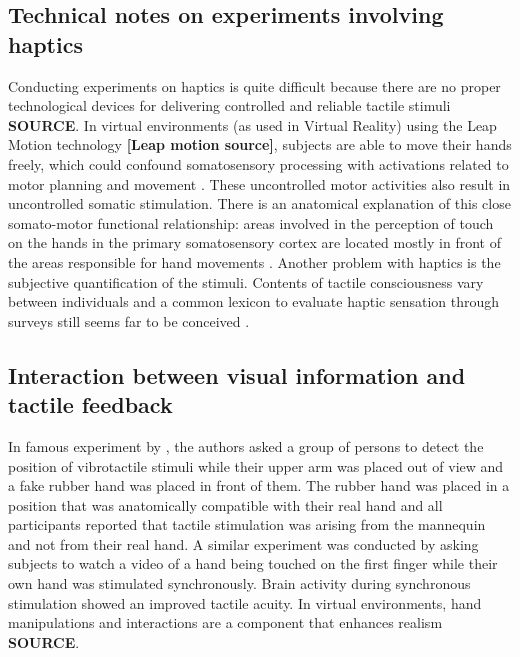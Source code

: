 \documentclass{vgtc}
\begin{document}
\subsection{Technical notes on experiments involving haptics}
Conducting experiments on haptics is quite difficult because there are no proper technological devices for delivering controlled and reliable tactile stimuli \textbf{SOURCE}. In virtual environments (as used in Virtual Reality) using the Leap Motion technology \textbf{[Leap motion source]}, subjects are able to move their hands freely, which  could confound somatosensory processing with activations related to motor planning and movement \cite{Bodegard2001}. These uncontrolled motor activities also result in uncontrolled somatic stimulation. There is an anatomical explanation of this close somato-motor functional relationship: areas involved in the perception of touch on the hands in the primary somatosensory cortex are located mostly in front of the areas responsible for hand movements \cite{Penfield1950}.
Another problem with haptics is the subjective quantification of the stimuli. Contents of tactile consciousness vary between individuals and a common lexicon to evaluate haptic sensation through surveys still seems far to be conceived \cite{Gallace2010}.

\subsection{Interaction between visual information and tactile feedback}
In famous experiment by \cite{Pavani2000}, the authors asked a group of persons to detect the position of vibrotactile stimuli while their upper arm was placed out of view and a fake rubber hand was placed in front of them. The rubber hand was placed in a position that was anatomically compatible with their real hand and all participants reported that tactile stimulation was arising from the mannequin and not from their real hand. A similar experiment was conducted by \cite{Schaefer2006} asking subjects to watch a video of a hand being touched on the first finger while their own hand was stimulated synchronously. Brain activity during synchronous stimulation showed an improved tactile acuity. In virtual environments, hand manipulations and interactions are a component that enhances realism \textbf{SOURCE}. 
\end{document}
